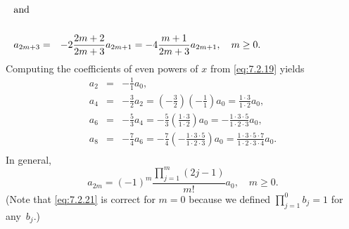 \begin{examplesolution}
\begin{eqnarray}
  \noalign{\hspace*{-15pt}\mbox{and}}\nonumber                                                                                         \\
  a_{2m+3}                                     & = & -2{\frac{2m+2}{2m+3}}a_{2m+1}=-4{\frac{m+1}{2m+3}}a_{2m+1},\quad m\ge0.\label{eq:7.2.20}
\end{eqnarray}
Computing the coefficients of even powers of $x$ from \eqref{eq:7.2.19} yields
\begin{eqnarray*}
  a_{2}&=&-\frac{1}{1}a_{0},\\[5pt] a_{4}&=&-\frac{3}{2}a_{2}=\left(-\frac{3}{2}\right)\left(-\frac{1}{1}\right)a_{0} =\frac{1\cdot3}{1\cdot2}a_{0}, \\[5pt]a_{6}&=&-\frac{5}{3}a_{4}= -\frac{5}{3}\left(\frac{1\cdot3}{1\cdot2}\right)a_{0} =-\frac{1\cdot3\cdot5}{1\cdot2\cdot3}a_{0},\\[5pt] a_{8}&=&-\frac{7}{4}a_{6}=-\frac{7}{4} \left(-\frac{1\cdot3\cdot5}{1\cdot2\cdot3}\right)a_{0}= \frac{1\cdot3\cdot5\cdot7}{1\cdot2\cdot3\cdot4}a_{0}.\\
\end{eqnarray*}
In general,
\begin{equation}
  \label{eq:7.2.21}a_{2m}=(-1)^{m}\frac{\prod_{j=1}^{m}(2j-1)}{m!}a_{0},\quad m\ge0.
\end{equation}
(Note that \eqref{eq:7.2.21} is correct for $m=0$ because we defined $\prod_{j=1}^{0}b_{j}=1$ for
any~$b_{j}$.)


\end{examplesolution}
